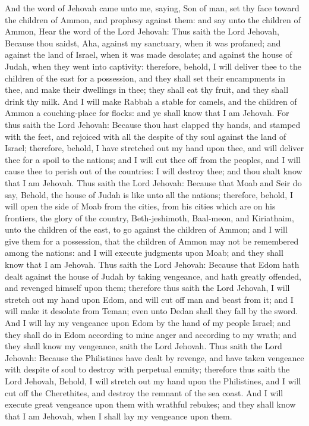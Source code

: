 And the word of Jehovah came unto me, saying, Son of man, set thy face toward the children of Ammon, and prophesy against them: and say unto the children of Ammon, Hear the word of the Lord Jehovah: Thus saith the Lord Jehovah, Because thou saidst, Aha, against my sanctuary, when it was profaned; and against the land of Israel, when it was made desolate; and against the house of Judah, when they went into captivity: therefore, behold, I will deliver thee to the children of the east for a possession, and they shall set their encampments in thee, and make their dwellings in thee; they shall eat thy fruit, and they shall drink thy milk. And I will make Rabbah a stable for camels, and the children of Ammon a couching-place for flocks: and ye shall know that I am Jehovah. For thus saith the Lord Jehovah: Because thou hast clapped thy hands, and stamped with the feet, and rejoiced with all the despite of thy soul against the land of Israel; therefore, behold, I have stretched out my hand upon thee, and will deliver thee for a spoil to the nations; and I will cut thee off from the peoples, and I will cause thee to perish out of the countries: I will destroy thee; and thou shalt know that I am Jehovah.  Thus saith the Lord Jehovah: Because that Moab and Seir do say, Behold, the house of Judah is like unto all the nations; therefore, behold, I will open the side of Moab from the cities, from his cities which are on his frontiers, the glory of the country, Beth-jeshimoth, Baal-meon, and Kiriathaim, unto the children of the east, to go against the children of Ammon; and I will give them for a possession, that the children of Ammon may not be remembered among the nations: and I will execute judgments upon Moab; and they shall know that I am Jehovah.  Thus saith the Lord Jehovah: Because that Edom hath dealt against the house of Judah by taking vengeance, and hath greatly offended, and revenged himself upon them; therefore thus saith the Lord Jehovah, I will stretch out my hand upon Edom, and will cut off man and beast from it; and I will make it desolate from Teman; even unto Dedan shall they fall by the sword. And I will lay my vengeance upon Edom by the hand of my people Israel; and they shall do in Edom according to mine anger and according to my wrath; and they shall know my vengeance, saith the Lord Jehovah.  Thus saith the Lord Jehovah: Because the Philistines have dealt by revenge, and have taken vengeance with despite of soul to destroy with perpetual enmity; therefore thus saith the Lord Jehovah, Behold, I will stretch out my hand upon the Philistines, and I will cut off the Cherethites, and destroy the remnant of the sea coast. And I will execute great vengeance upon them with wrathful rebukes; and they shall know that I am Jehovah, when I shall lay my vengeance upon them. 

